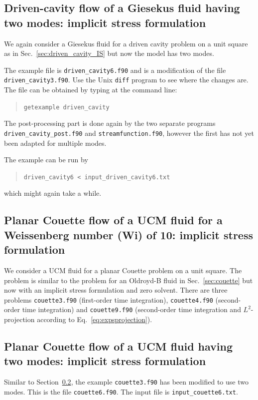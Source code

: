 \subsection{Driven-cavity flow of a Giesekus fluid having two modes: implicit
stress formulation} 
\label{sec:driven_cavity2_IS}

We again consider a Giesekus fluid for a driven cavity problem on a unit square
as in Sec.~\ref{sec:driven_cavity_IS} but now the model has two modes.

The example file is \texttt{driven\_cavity6.f90}
and is a modification of the file
\texttt{driven\_cavity3.f90}. Use the Unix \texttt{diff} program to see where
the changes are. The file can be obtained by typing at the
command line:
\medskip
\begin{quote}
   \texttt{getexample driven\_cavity}
\end{quote}
The post-processing part is done again by the two separate programs
\texttt{driven\_cavity\_post.f90} and \texttt{streamfunction.f90}, however the
first has not yet been adapted for multiple modes.

The example can be run by
\begin{quote}
   \texttt{driven\_cavity6 < input\_driven\_cavity6.txt}
\end{quote}
which might again take a while.

\subsection{Planar Couette flow of a UCM fluid for a
 Weissenberg number (Wi) of 10: implicit stress formulation}
\label{sec:couette_IS}

We consider a UCM fluid for a planar Couette problem on a unit square.
The problem is similar to the problem for an Oldroyd-B fluid in
Sec.~\ref{sec:couette} but now with an implicit stress formulation and
zero solvent. There are three problems \texttt{couette3.f90} (first-order time
integration), \texttt{couette4.f90} (second-order time integration) and
\texttt{couette9.f90} (second-order time integration and
$L^2$-projection according to Eq.~\eqref{eq:expsprojection}).


\subsection{Planar Couette flow of a UCM fluid having two modes: implicit stress formulation}
Similar to Section~\ref{sec:couette_IS}, the example \texttt{couette3.f90}
has been modified to use two modes. This is the file \texttt{couette6.f90}.
The input file is \texttt{input\_couette6.txt}.

